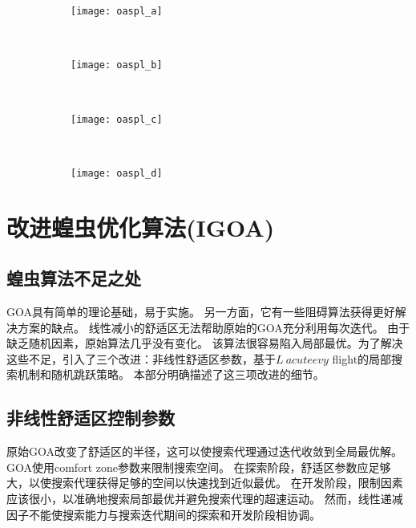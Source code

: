 \begin{figure}[!htbp]
    \centering
    \begin{subfigure}[b]{0.35\textwidth}
      \texttt{[image: oaspl\_a]}
      \caption{}
      \label{fig:oaspl_a}
    \end{subfigure}%
    ~%
    \begin{subfigure}[b]{0.35\textwidth}
      \texttt{[image: oaspl\_b]}
      \caption{}
      \label{fig:oaspl_b}
    \end{subfigure}
    \\%
    \begin{subfigure}[b]{0.35\textwidth}
      \texttt{[image: oaspl\_c]}
      \caption{}
      \label{fig:oaspl_c}
    \end{subfigure}%
    ~%
    \begin{subfigure}[b]{0.35\textwidth}
      \texttt{[image: oaspl\_d]}
      \caption{}
      \label{fig:oaspl_d}
    \end{subfigure}
    \label{fig:oaspl}
\end{figure}
\section{改进蝗虫优化算法(IGOA)}
\subsection{蝗虫算法不足之处}
GOA具有简单的理论基础，易于实施。 另一方面，它有一些阻碍算法获得更好解决方案的缺点。
线性减小的舒适区无法帮助原始的GOA充分利用每次迭代。 由于缺乏随机因素，原始算法几乎没有变化。 该算法很容易陷入局部最优。为了解决这些不足，引入了三个改进：非线性舒适区参数，基于$ L \ acute {e} vy $ flight的局部搜索机制和随机跳跃策略。 本部分明确描述了这三项改进的细节。
\subsection{非线性舒适区控制参数}
原始GOA改变了舒适区的半径，这可以使搜索代理通过迭代收敛到全局最优解。 GOA使用comfort zone参数来限制搜索空间。 在探索阶段，舒适区参数应足够大，以使搜索代理获得足够的空间以快速找到近似最优。 在开发阶段，限制因素应该很小，以准确地搜索局部最优并避免搜索代理的超速运动。 然而，线性递减因子不能使搜索能力与搜索迭代期间的探索和开发阶段相协调。

